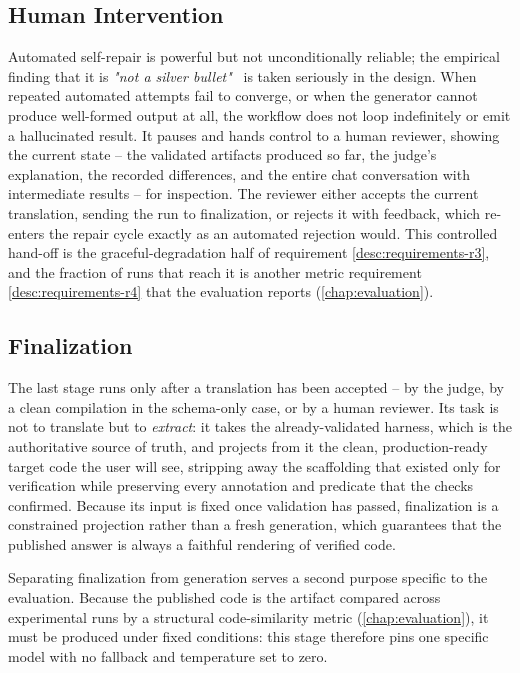 \subsection{Human Intervention}
\label{sec:workflow-human}

Automated self-repair is powerful but not unconditionally reliable; the empirical finding that it is \emph{"not a silver bullet"}~\cite{olaussonSelfRepair2024} is taken seriously in the design. When repeated automated attempts fail to converge, or when the generator cannot produce well-formed output at all, the workflow does not loop indefinitely or emit a hallucinated result. It pauses and hands control to a human reviewer, showing the current state -- the validated artifacts produced so far, the judge's explanation, the recorded differences, and the entire chat conversation with intermediate results -- for inspection. The reviewer either accepts the current translation, sending the run to finalization, or rejects it with feedback, which re-enters the repair cycle exactly as an automated rejection would. This controlled hand-off is the graceful-degradation half of requirement \ref{desc:requirements-r3}, and the fraction of runs that reach it is another metric requirement \ref{desc:requirements-r4} that the evaluation reports (\cref{chap:evaluation}).

\subsection{Finalization}
\label{sec:workflow-finalize}

The last stage runs only after a translation has been accepted -- by the judge, by a clean compilation in the schema-only case, or by a human reviewer. Its task is not to translate but to \emph{extract}: it takes the already-validated harness, which is the authoritative source of truth, and projects from it the clean, production-ready target code the user will see, stripping away the scaffolding that existed only for verification while preserving every annotation and predicate that the checks confirmed. Because its input is fixed once validation has passed, finalization is a constrained projection rather than a fresh generation, which guarantees that the published answer is always a faithful rendering of verified code.

Separating finalization from generation serves a second purpose specific to the evaluation. Because the published code is the artifact compared across experimental runs by a structural code-similarity metric (\cref{chap:evaluation}), it must be produced under fixed conditions: this stage therefore pins one specific model with no fallback and temperature set to zero.

